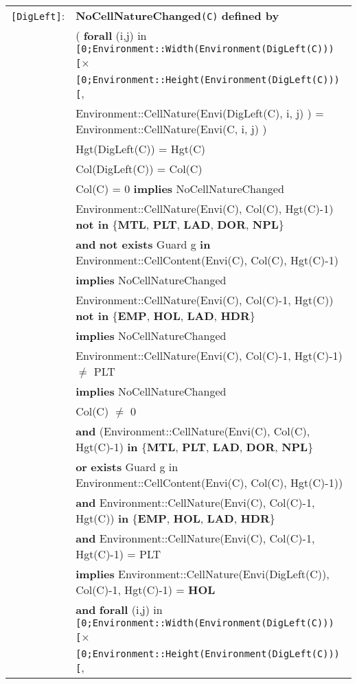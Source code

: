 \documentclass[7pt]{article}
\begin{document}
\begin{tabular}{rl}
\texttt{[DigLeft]}:& \textbf{NoCellNatureChanged}\texttt{(C)} \textbf{defined by} \\ 
&\quad\quad ( {\textbf{forall}} (i,j) {in} \texttt{[0;Environment::Width(Environment(DigLeft(C)))[}× \\ & \quad\quad\quad\quad\quad\quad\quad\quad\quad \texttt{[0;Environment::Height(Environment(DigLeft(C)))[}, \\
       & \quad\quad\quad\quad\quad\quad Environment::CellNature(Envi(DigLeft(C), i, j) ) = Environment::CellNature(Envi(C, i, j) ) \\
& Hgt(DigLeft(C)) = Hgt(C) \\
& Col(DigLeft(C)) = Col(C) \\
& Col(C) = 0 \textbf{implies} NoCellNatureChanged \\
& Environment::CellNature(Envi(C), Col(C), Hgt(C)-1) \textbf{not in} \{\textbf{MTL}, \textbf{PLT}, \textbf{LAD}, \textbf{DOR}, \textbf{NPL}\} \\
& \quad \textbf{and} \textbf{not exists} Guard g \textbf{in} Environment::CellContent(Envi(C), Col(C), Hgt(C)-1) \\
& \quad \textbf{implies} NoCellNatureChanged \\
& Environment::CellNature(Envi(C), Col(C)-1, Hgt(C)) \textbf{not in} \{\textbf{EMP}, \textbf{HOL}, \textbf{LAD}, \textbf{HDR}\} \\
& \quad \textbf{implies} NoCellNatureChanged \\
& Environment::CellNature(Envi(C), Col(C)-1, Hgt(C)-1) $\neq$ PLT \\
& \quad \textbf{implies} NoCellNatureChanged \\
& Col(C) $\neq$ 0 \\
& \quad \textbf{and} (Environment::CellNature(Envi(C), Col(C), Hgt(C)-1) \textbf{in} \{\textbf{MTL}, \textbf{PLT}, \textbf{LAD}, \textbf{DOR}, \textbf{NPL}\} \\
& \quad\quad \textbf{or} \textbf{exists} Guard g {in} Environment::CellContent(Envi(C), Col(C), Hgt(C)-1)) \\
& \quad \textbf{and} Environment::CellNature(Envi(C), Col(C)-1, Hgt(C)) \textbf{in} \{\textbf{EMP}, \textbf{HOL}, \textbf{LAD}, \textbf{HDR}\} \\
& \quad \textbf{and}  Environment::CellNature(Envi(C), Col(C)-1, Hgt(C)-1) = PLT \\
& \quad \textbf{implies} Environment::CellNature(Envi(DigLeft(C)), Col(C)-1, Hgt(C)-1) = \textbf{HOL} \\
& \quad\quad \textbf{and} {\textbf{forall}} (i,j) {in} \texttt{[0;Environment::Width(Environment(DigLeft(C)))[}× \\ & \quad\quad\quad\quad\quad\quad\quad\quad\quad\quad\texttt{[0;Environment::Height(Environment(DigLeft(C)))[}, \\

\end{tabular}
\end{document}
